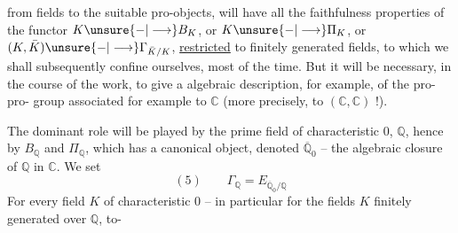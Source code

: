 from fields to the suitable pro-objects, will have all the faithfulness properties of the functor $K\unsure{-|\longrightarrow}B_K$, or $K\unsure{-|\longrightarrow}\Pi_K$, or $(K,\bar K)\unsure{-|\longrightarrow}\Gamma_{\bar K/K}$, \uline{restricted} to  finitely generated fields, to which we shall subsequently confine ourselves, most of the time. But it will be necessary, in the course of the work, to give a  algebraic description, for example, of the pro-pro- group associated for example to $\mathbb C$ (more precisely, to $(\mathbb C,\mathbb C)$ !).

The dominant role will be played by the prime field of characteristic $0$, $\mathbb Q$, hence by $B_{\mathbb Q}$ and $\Pi_{\mathbb Q}$, which has a canonical object, denoted $\overline{\mathbb Q}_0$ -- the algebraic closure of $\mathbb Q$ in $\mathbb C$. We set
\[
(5)\qquad \Gamma_{\mathbb Q}=E_{\overline{\mathbb Q}_0/\mathbb Q}
\]
For every field $K$ of characteristic $0$ -- in particular for the fields $K$ finitely generated over $\mathbb Q$, to-

